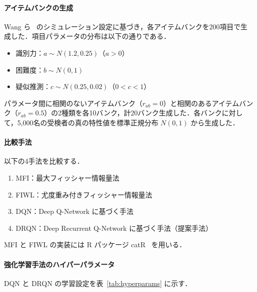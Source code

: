 \documentclass[dvipdfmx,a4j]{jarticle}
\begin{document}
\paragraph{アイテムバンクの生成}
Wang ら~\cite{wang2024} のシミュレーション設定に基づき，各アイテムバンクを200項目で生成した．項目パラメータの分布は以下の通りである．
\begin{itemize}
\item 識別力：$a \sim N(1.2, 0.25)$（$a > 0$）
\item 困難度：$b \sim N(0, 1)$
\item 疑似推測：$c \sim N(0.25, 0.02)$（$0 < c < 1$）
\end{itemize}
パラメータ間に相関のないアイテムバンク（$r_{ab}=0$）と相関のあるアイテムバンク（$r_{ab}=0.5$）の2種類を各10バンク，計20バンク生成した．各バンクに対して，5,000名の受検者の真の特性値を標準正規分布 $N(0,1)$ から生成した．

\paragraph{比較手法}
以下の4手法を比較する．
\begin{enumerate}
\item MFI：最大フィッシャー情報量法~\cite{lord1980}
\item FIWL：尤度重み付きフィッシャー情報量法~\cite{veerkamp1997}
\item DQN：Deep Q-Network に基づく手法~\cite{wang2024}
\item DRQN：Deep Recurrent Q-Network に基づく手法（提案手法）
\end{enumerate}
MFI と FIWL の実装には R パッケージ catR~\cite{magis2017} を用いる．

\paragraph{強化学習手法のハイパーパラメータ}
DQN と DRQN の学習設定を表~\ref{tab:hyperparams} に示す．
\end{document}
